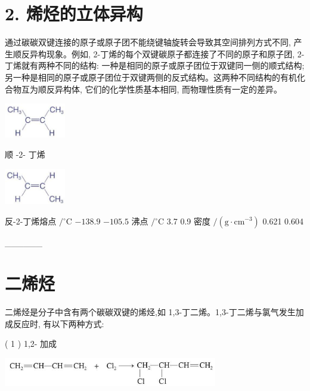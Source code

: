 \documentclass[10pt]{article}
\begin{document}
\section*{2. 烯烃的立体异构}

通过碳碳双键连接的原子或原子团不能绕键轴旋转会导致其空间排列方式不同, 产生顺反异构现象。例如, 2-丁烯的每个双键碳原子都连接了不同的原子和原子团, 2-丁烯就有两种不同的结构: 一种是相同的原子或原子团位于双键同一侧的顺式结构; 另一种是相同的原子或原子团位于双键两侧的反式结构。这两种不同结构的有机化合物互为顺反异构体, 它们的化学性质基本相同, 而物理性质有一定的差异。

\begin{center}
\includegraphics[max width=0.2\textwidth]{images/0190efc5-b58a-7c43-bfb0-e0a030df9cfd_41_672557.jpg}
\end{center}

顺 -2- 丁烯

\begin{center}
\includegraphics[max width=0.2\textwidth]{images/0190efc5-b58a-7c43-bfb0-e0a030df9cfd_41_169283.jpg}
\end{center}

反-2-丁烯熔点 \(/{}^{ \circ }\mathrm{C}\) \(- {138.9}\) \(- {105.5}\) 沸点 \(/{}^{ \circ }\mathrm{C}\) 3.7 0.9 密度 \(/\left( {\mathrm{g} \cdot {\mathrm{{cm}}}^{-3}}\right)\) 0.621 0.604

\_\_\_\_\_\_

\section*{二烯烃}

二烯烃是分子中含有两个碳碳双键的烯烃,如 1,3-丁二烯。1,3-丁二烯与氯气发生加成反应时, 有以下两种方式:

( 1 ) 1,2- 加成

\begin{center}
\includegraphics[max width=0.7\textwidth]{images/0190efc5-b58a-7c43-bfb0-e0a030df9cfd_41_877478.jpg}
\end{center}
\end{document}
